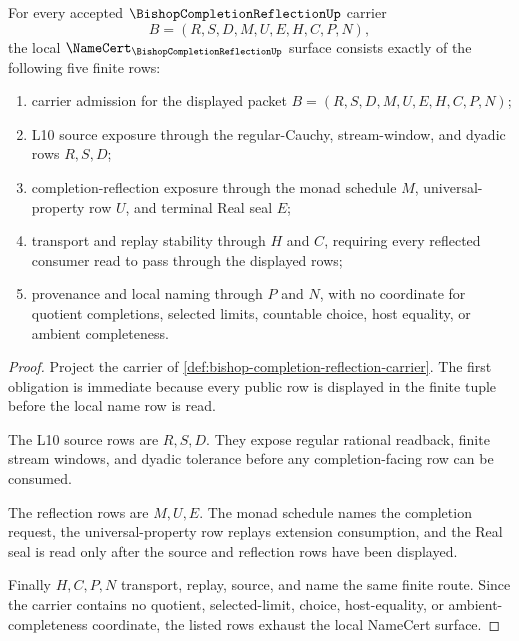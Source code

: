 \begin{theorem}
\label{thm:bishop-completion-reflection-namecert-obligations}
For every accepted $\BishopCompletionReflectionUp$ carrier
$$
B=(R,S,D,M,U,E,H,C,P,N),
$$
the local $\NameCert_{\BishopCompletionReflectionUp}$ surface consists exactly of the following five finite rows:
\begin{enumerate}
\item carrier admission for the displayed packet $B=(R,S,D,M,U,E,H,C,P,N)$;
\item L10 source exposure through the regular-Cauchy, stream-window, and dyadic rows $R,S,D$;
\item completion-reflection exposure through the monad schedule $M$, universal-property row $U$, and terminal Real seal $E$;
\item transport and replay stability through $H$ and $C$, requiring every reflected consumer read to pass through the displayed rows;
\item provenance and local naming through $P$ and $N$, with no coordinate for quotient completions, selected limits, countable choice, host equality, or ambient completeness.
\end{enumerate}
\end{theorem}
\begin{proof}
Project the carrier of \autoref{def:bishop-completion-reflection-carrier}. The first obligation is immediate because every public row is displayed in the finite tuple before the local name row is read.

The L10 source rows are $R,S,D$. They expose regular rational readback, finite stream windows, and dyadic tolerance before any completion-facing row can be consumed.

The reflection rows are $M,U,E$. The monad schedule names the completion request, the universal-property row replays extension consumption, and the Real seal is read only after the source and reflection rows have been displayed.

Finally $H,C,P,N$ transport, replay, source, and name the same finite route. Since the carrier contains no quotient, selected-limit, choice, host-equality, or ambient-completeness coordinate, the listed rows exhaust the local NameCert surface.
\end{proof}

